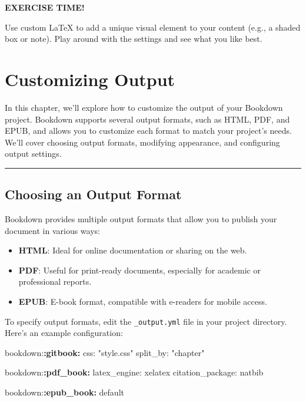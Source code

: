 \documentclass[
]{book}
\newenvironment{Shaded}{\begin{snugshade}}{\end{snugshade}}
\newcommand{\NormalTok}[1]{#1}
\newcommand{\SpecialCharTok}[1]{\textcolor[rgb]{0.81,0.36,0.00}{\textbf{#1}}}
\providecommand{\tightlist}{%
  \setlength{\itemsep}{0pt}\setlength{\parskip}{0pt}}
\newenvironment{blackbox}{
  \definecolor{shadecolor}{rgb}{0, 0, 0}  %
  \color{white}
  \begin{shaded}}
 {\end{shaded}}
\theoremstyle{definition}
\theoremstyle{definition}
\theoremstyle{definition}
\theoremstyle{definition}
\theoremstyle{remark}
\begin{document}
\begin{blackbox}

\begin{center}
\textbf{EXERCISE TIME!}

\end{center}

Use custom LaTeX to add a unique visual element to your content (e.g., a shaded box or note). Play around with the settings and see what you like best.

\end{blackbox}

\chapter{Customizing Output}\label{chapter7}

In this chapter, we'll explore how to customize the output of your Bookdown project. Bookdown supports several output formats, such as HTML, PDF, and EPUB, and allows you to customize each format to match your project's needs. We'll cover choosing output formats, modifying appearance, and configuring output settings.

\begin{center}\rule{0.5\linewidth}{0.5pt}\end{center}

\section{Choosing an Output Format}\label{choosing-an-output-format}

Bookdown provides multiple output formats that allow you to publish your document in various ways:

\begin{itemize}
\tightlist
\item
  \textbf{HTML}: Ideal for online documentation or sharing on the web.
\item
  \textbf{PDF}: Useful for print-ready documents, especially for academic or professional reports.
\item
  \textbf{EPUB}: E-book format, compatible with e-readers for mobile access.
\end{itemize}

To specify output formats, edit the \texttt{\_output.yml} file in your project directory. Here's an example configuration:

\begin{Shaded}
\begin{Highlighting}[]
\NormalTok{bookdown:}\SpecialCharTok{:gitbook:}
\NormalTok{  css: "style.css"}
\NormalTok{  split\_by: "chapter"}

\NormalTok{bookdown:}\SpecialCharTok{:pdf\_book:}
\NormalTok{  latex\_engine: xelatex}
\NormalTok{  citation\_package: natbib}

\NormalTok{bookdown:}\SpecialCharTok{:epub\_book:}\NormalTok{ default}
\end{Highlighting}
\end{Shaded}
\end{document}

